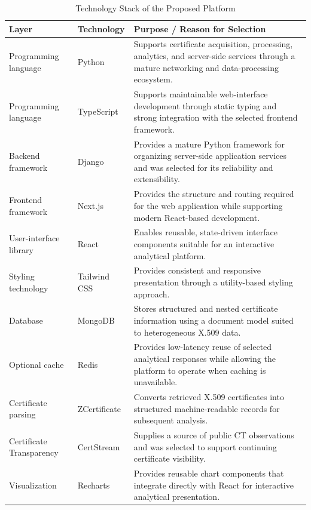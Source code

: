 \begin{table}[H]
  \centering
  \footnotesize
  \setlength{\tabcolsep}{4pt}
  \renewcommand{\arraystretch}{1.07}
  \caption{Technology Stack of the Proposed Platform}
  \label{tab:technology-stack}
  \begin{tabularx}{\textwidth}{@{}>{\RaggedRight\arraybackslash}p{}>{\RaggedRight\arraybackslash}p{}Y@{}}
    \toprule
    \textbf{Layer} & \textbf{Technology} & \textbf{Purpose / Reason for Selection} \\
    \midrule
    Programming language & Python & Supports certificate acquisition, processing, analytics, and server-side services through a mature networking and data-processing ecosystem. \\
    Programming language & TypeScript & Supports maintainable web-interface development through static typing and strong integration with the selected frontend framework. \\
    Backend framework & Django & Provides a mature Python framework for organizing server-side application services and was selected for its reliability and extensibility. \\
    Frontend framework & Next.js & Provides the structure and routing required for the web application while supporting modern React-based development. \\
    User-interface library & React & Enables reusable, state-driven interface components suitable for an interactive analytical platform. \\
    Styling technology & Tailwind CSS & Provides consistent and responsive presentation through a utility-based styling approach. \\
    Database & MongoDB & Stores structured and nested certificate information using a document model suited to heterogeneous X.509 data. \\
    Optional cache & Redis & Provides low-latency reuse of selected analytical responses while allowing the platform to operate when caching is unavailable. \\
    Certificate parsing & ZCertificate & Converts retrieved X.509 certificates into structured machine-readable records for subsequent analysis. \\
    Certificate Transparency & CertStream & Supplies a source of public CT observations and was selected to support continuing certificate visibility. \\
    Visualization & Recharts & Provides reusable chart components that integrate directly with React for interactive analytical presentation. \\
    \bottomrule
  \end{tabularx}
\end{table}

